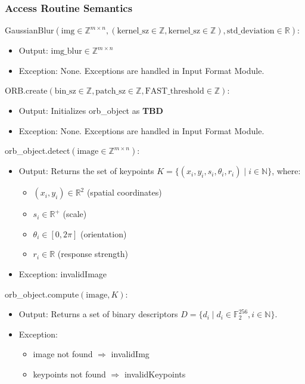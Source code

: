 \documentclass[12pt, titlepage]{article}
\begin{document}
\subsubsection{Access Routine Semantics}

\noindent GaussianBlur$(\text{img} \in \mathbb{Z}^{m \times n}, (\text{kernel\_sz} 
\in \mathbb{Z}, \text{kernel\_sz} \in \mathbb{Z}), \text{std\_deviation} \in \mathbb{R})$:
\begin{itemize}
    \item Output: $\text{img\_blur} \in \mathbb{Z}^{m \times n}$
    \item Exception: None. Exceptions are handled in Input Format Module.
\end{itemize}

\noindent ORB.create$(\text{bin\_sz} \in \mathbb{Z}, \text{patch\_sz} \in \mathbb{Z}, \text{FAST\_threshold} \in \mathbb{Z})$:
\begin{itemize}
    \item Output: Initializes orb\_object as \textbf{TBD}
    \item Exception: None. Exceptions are handled in Input Format Module.
\end{itemize}

\noindent orb\_object.detect$(\text{image} \in \mathbb{Z}^{m \times n})$:
\begin{itemize}
    \item Output: Returns the set of keypoints \( K = \{ (x_i, y_i, s_i, \theta_i, r_i) \mid i \in \mathbb{N} \} \), where:
    \begin{itemize}
        \item \( (x_i, y_i) \in \mathbb{R}^2 \) (spatial coordinates)
        \item \( s_i \in \mathbb{R}^+ \) (scale)
        \item \( \theta_i \in [0, 2\pi] \) (orientation)
        \item \( r_i \in \mathbb{R} \) (response strength)
    \end{itemize}
    \item Exception: invalidImage
\end{itemize}

\noindent orb\_object.compute$(\text{image}, K)$:
\begin{itemize}
    \item Output: Returns a set of binary descriptors \( D = \{ d_i \mid d_i \in \mathbb{F}_2^{256}, i \in \mathbb{N} \} \).
    \item Exception:
    \begin{itemize}
      \item image not found $\Rightarrow$ invalidImg
      \item keypoints not found $\Rightarrow$ invalidKeypoints
    \end{itemize}
\end{itemize}
\end{document}
